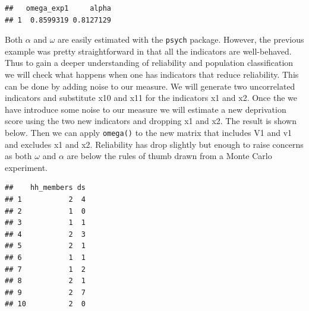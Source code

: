 \documentclass[]{book}
\newenvironment{Shaded}{\begin{snugshade}}{\end{snugshade}}
\newcommand{\CommentTok}[1]{\textcolor[rgb]{0.56,0.35,0.01}{\textit{#1}}}
\newcommand{\DataTypeTok}[1]{\textcolor[rgb]{0.13,0.29,0.53}{#1}}
\newcommand{\DecValTok}[1]{\textcolor[rgb]{0.00,0.00,0.81}{#1}}
\newcommand{\KeywordTok}[1]{\textcolor[rgb]{0.13,0.29,0.53}{\textbf{#1}}}
\newcommand{\NormalTok}[1]{#1}
\newcommand{\OperatorTok}[1]{\textcolor[rgb]{0.81,0.36,0.00}{\textbf{#1}}}
\begin{document}
\begin{verbatim}
##   omega_exp1     alpha
## 1  0.8599319 0.8127129
\end{verbatim}

Both \(\alpha\) and \(\omega\) are easily estimated with the \texttt{psych} package. However, the previous example was pretty straightforward in that all the indicators are well-behaved. Thus to gain a deeper understanding of reliability and population classification we will check what happens when one has indicators that reduce reliability. This can be done by adding noise to our measure. We will generate two uncorrelated indicators and substitute x10 and x11 for the indicators x1 and x2.
Once the we have introduce some noise to our measure we will estimate a new deprivation score using the two new indicators and dropping x1 and x2. The result is shown below. Then we can apply \texttt{omega()} to the new matrix that includes V1 and v1 and excludes x1 and x2. Reliability has drop slightly but enough to raise concerns as both \(\omega\) and \(\alpha\) are below the rules of thumb drawn from a Monte Carlo experiment.

\begin{Shaded}
\end{Shaded}

\begin{verbatim}
##    hh_members ds
## 1           2  4
## 2           1  0
## 3           1  1
## 4           2  3
## 5           2  1
## 6           1  1
## 7           1  2
## 8           2  1
## 9           2  7
## 10          2  0
\end{verbatim}

\begin{Shaded}
\end{Shaded}
\end{document}
